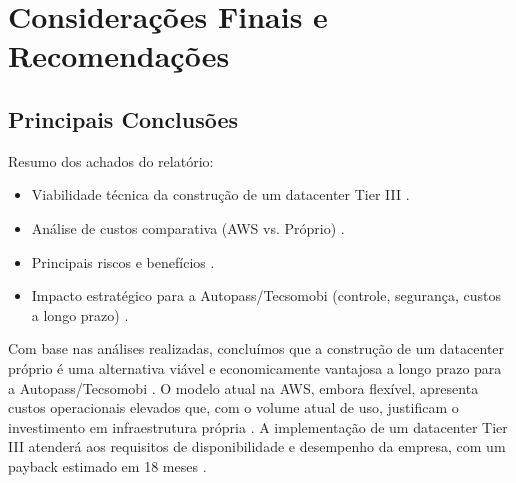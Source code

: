 \documentclass[
	12pt,				%
	oneside,			%
	a4paper,			%
	english,			%
	brazil				%
	]{abntex2unama}
\begin{document}
\chapter{Considerações Finais e Recomendações}
\section{Principais Conclusões}
Resumo dos achados do relatório:
\begin{itemize}
	\item Viabilidade técnica da construção de um datacenter Tier III \cite{reliability_engineering}.
	\item Análise de custos comparativa (AWS vs. Próprio) \cite{capacity_planning} \cite{hyperscale_datacenters}.
	\item Principais riscos e benefícios \cite{disaster_recovery}.
	\item Impacto estratégico para a Autopass/Tecsomobi (controle, segurança, custos a longo prazo) \cite{datacenter_security} \cite{energy_efficiency}.
\end{itemize}

Com base nas análises realizadas, concluímos que a construção de um datacenter próprio é uma alternativa viável e economicamente vantajosa a longo prazo para a Autopass/Tecsomobi \cite{dcim_systems}. O modelo atual na AWS, embora flexível, apresenta custos operacionais elevados que, com o volume atual de uso, justificam o investimento em infraestrutura própria \cite{cloud_infrastructure}. A implementação de um datacenter Tier III atenderá aos requisitos de disponibilidade e desempenho da empresa, com um payback estimado em 18 meses \cite{design_principles}.
\end{document}
